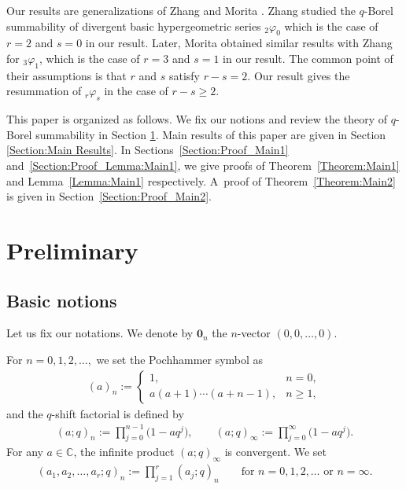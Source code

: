 \documentclass[11pt]{article}
\numberwithin{equation}{section}
\begin{document}
Our results are generalizations of Zhang \cite{Zhang2002} and Morita \cite{Morita2014}. Zhang studied the $q$-Borel summability of divergent basic hypergeometric series ${}_2\varphi_0$ which is the case of $r=2$ and $s=0$ in our result. Later, Morita obtained similar results with Zhang for ${}_3\varphi_1$, which is the case of $r=3$ and $s=1$ in our result. The common point of their assumptions is that $r$ and $s$ satisfy $r-s=2$. Our result gives the resummation of ${}_r\varphi_s$ in the case of $r-s\ge2$.

This paper is organized as follows. We fix our notions and review the theory of $q$-Borel summability in Section \ref{Section:Preliminary}. Main results of this paper are given in Section \ref{Section:Main Results}. In Sections~\ref{Section:Proof_Main1} and~\ref{Section:Proof_Lemma:Main1}, we give proofs of Theorem~\ref{Theorem:Main1} and Lemma~\ref{Lemma:Main1} respectively. A~proof of Theorem~\ref{Theorem:Main2} is given in Section~\ref{Section:Proof_Main2}.


\setcounter{section}{1}
\setcounter{subsection}{0}
\setcounter{subsubsection}{0}
\setcounter{Theorem}{1}
\setcounter{equation}{6}
\section{Preliminary}\label{Section:Preliminary}
\subsection{Basic notions}
Let us fix our notations. We denote by $\bm{0}_n$ the $n$-vector $(0,0,\ldots,0)$.

For $n=0,1,2,\ldots,$ we set the Pochhammer symbol as
\begin{gather*}
(a)_n:=
\begin{cases}
1,& n=0,\\
a(a+1)\cdots(a+n-1), &n\geq1,
\end{cases}
\end{gather*}
and the $q$-shift factorial is defined by
\begin{gather*}
(a;q)_n:=\prod_{j=0}^{n-1}\big(1-aq^j\big),\qquad (a;q)_\infty:=\prod_{j=0}^\infty \big(1-aq^j\big).
\end{gather*}
For any $a\in\mathbb{C}$, the infinite product $(a;q)_\infty$ is convergent. We set
\begin{gather*} (a_1,a_2,\ldots,a_r;q)_{n}:=\prod\limits_{j=1}^r (a_j;q)_n \qquad \text{for $n=0,1,2,\ldots$ or $n=\infty$}.
\end{gather*}
\end{document}
